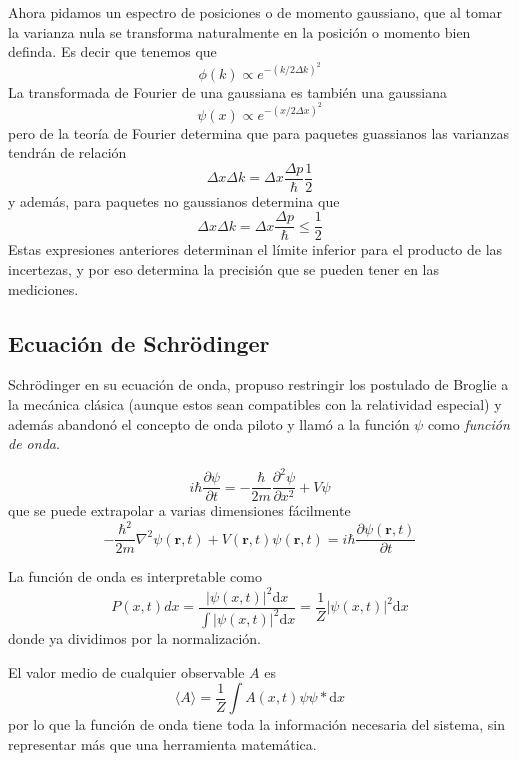 \documentclass{book}
\numberwithin{equation}{section} %
\begin{document}
Ahora pidamos un espectro de posiciones o de momento gaussiano, que al tomar la varianza nula se transforma naturalmente en la posición o momento bien definda.
Es decir que tenemos que
\[ \phi(k) \propto e^{-\left(k/2\Delta k\right)^2} \]
La transformada de Fourier de una gaussiana es también una gaussiana
\[ \psi(x) \propto e^{-\left(x/2\Delta x\right)^2}\]
pero de la teoría de Fourier determina que para paquetes guassianos las varianzas tendrán de relación
\begin{equation}
    \Delta x \Delta k = \Delta x \frac{\Delta p}{\hbar} \frac{1}{2}
\end{equation}
y además, para paquetes no gaussianos determina que
\begin{equation}
    \Delta x \Delta k = \Delta x \frac{\Delta p}{\hbar} \leq \frac{1}{2}
\end{equation}
Estas expresiones anteriores determinan el límite inferior para el producto de las incertezas, y por eso determina la precisión que se pueden tener en las mediciones.

\subsection{Ecuación de Schrödinger}
Schrödinger en su ecuación de onda, propuso restringir los postulado de Broglie a la mecánica clásica (aunque estos sean compatibles con la relatividad especial) y además abandonó el concepto de onda piloto y llamó a la función $\psi$ como \emph{función de onda}.

\begin{equation}
    i \hbar \frac{\partial \psi}{\partial t} = - \frac{\hbar}{2m} \frac{\partial^2 \psi}{\partial x^2} + V \psi
\end{equation}
que se puede extrapolar a varias dimensiones fácilmente
\begin{equation}
- \frac{\hbar^2}{2m} \nabla^2 \psi(\textbf{r},t) + V(\textbf{r},t) \psi(\textbf{r},t) = i \hbar \frac{\partial \psi(\textbf{r},t)}{\partial t}
\end{equation}

La función de onda es interpretable como
\begin{equation}
    P(x, t) dx = \frac{|\psi(x, t)|^2 \mathrm{d}x}{\int |\psi(x, t)|^2 \mathrm{d}x} = \frac{1}{Z} |\psi(x, t)|^2 \mathrm{d}x
\end{equation}
donde ya dividimos por la normalización.

El valor medio de cualquier observable $A$ es
\begin{equation}
    \langle A \rangle = \frac{1}{Z} \int A(x, t) \psi \psi * \mathrm{d}x
\end{equation}
por lo que la función de onda tiene toda la información necesaria del sistema, sin representar más que una herramienta matemática.
\end{document}
